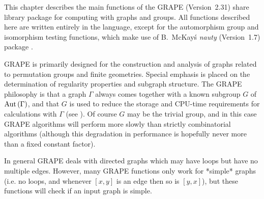 \def\GRAPE{\sf GRAPE}
\def\nauty{\it nauty}
\def\G{\Gamma}
\def\Aut{{\rm Aut}\,}
\def\x{\times}

This chapter describes the main functions  of the {\GRAPE} (Version~2.31)
share  library  package  for  computing  with  graphs  and  groups.   All
functions  described  here are  written entirely in  the {\GAP} language,
except for the  automorphism  group and  isomorphism  testing  functions,
which   make   use   of   B.~McKay\'s   {\nauty}   (Version~1.7)  package
\cite{Nau90}.

{\GRAPE}  is primarily designed  for  the  construction and   analysis of
graphs  related  to permutation groups  and finite geometries.    Special
emphasis is placed on    the determination of regularity  properties  and
subgraph  structure.  The  {\GRAPE}  philosophy is  that a graph $\Gamma$
always  comes together with  a known  subgroup $G$ of $\Aut(\Gamma)$, and
that $G$ is  used to reduce  the  storage and CPU-time  requirements  for
calculations with $\Gamma$ (see \cite{Soi91}).   Of course $G$ may be the
trivial group, and in this  case {\GRAPE}  algorithms will  perform  more
slowly than strictly combinatorial  algorithms (although this degradation
in performance is hopefully never more than a fixed constant factor).

In general {\GRAPE}  deals with directed graphs which may have loops  but
have  no multiple edges. However, many {\GRAPE}  functions  only work for
*simple* graphs (i.e. no  loops, and whenever $[x,y]$ is an edge then  so
is $[y,x]$), but these functions will check if an input graph is simple.

